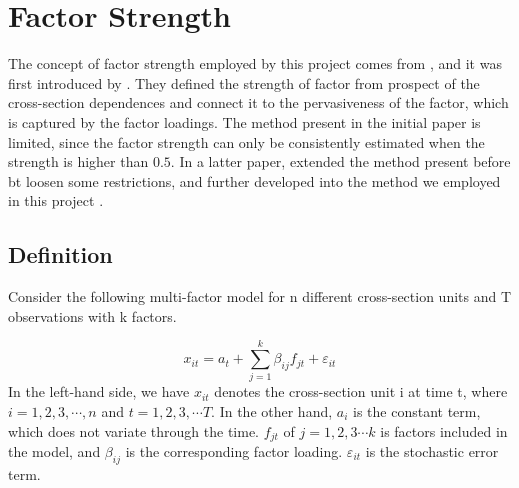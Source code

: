 \documentclass[12pt]{article}
\begin{document}
\section{Factor Strength}\label{strength}
The concept of factor strength employed by this project comes from , and it was first introduced by .
They defined the strength of factor from prospect of the cross-section dependences and connect it to the pervasiveness of the factor, which is captured by the factor loadings.
The method present in the initial paper is limited, since the factor strength can only be consistently estimated when the strength is higher than $0.5$.
In a latter paper,  extended the method present before bt loosen some restrictions, and further developed into the method we employed in this project \cite{Bailey2020}.

		\subsection{Definition}\label{definiton}

Consider the following multi-factor model for n different cross-section units and T observations with k  factors.

\[  x_{it} = a_{t}+  \sum_{j=1}^{k}\beta_{ij}f_{jt} + \varepsilon_{it} \tag{1}\label{definition_model} \]
In the left-hand side, we have $x_{it}$ denotes the cross-section unit i at time t, where $i = 1, 2,3, \cdots, n$ and $t = 1,2,3, \cdots T$.  
In the other hand, $a_{i}$ is the constant term, which does not variate through the time.
$f_{jt}$ of $j = 1, 2, 3\cdots k$ is factors included in the model, and $\beta_{ij}$ is the corresponding factor loading.
$\varepsilon_{it}$ is the stochastic error term.
\end{document}
